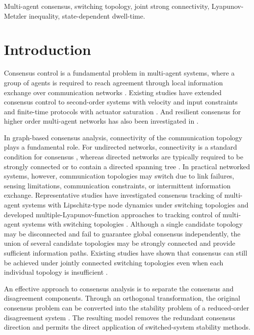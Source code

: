 \documentclass[conference]{IEEEtran}
\begin{document}
	\begin{IEEEkeywords}
		Multi-agent consensus, switching topology, joint strong connectivity, Lyapunov-Metzler inequality, state-dependent dwell-time.
	\end{IEEEkeywords}
	
	\section{Introduction}
	
	Consensus control is a fundamental problem in multi-agent systems,
	where a group of agents is required to reach agreement through local
	information exchange over communication networks
	\cite{olfati2007,wen2021book}. Existing studies have extended consensus control
	to second-order systems with velocity and input constraints and
	finite-time protocols with actuator saturation
	\cite{fu2019constraints,zhao2015finite}. And resilient consensus for higher order multi-agent networks has also been investigated in \cite{zhao2019tracking}.

	
	In graph-based consensus analysis, connectivity of the communication
	topology plays a fundamental role. For undirected networks,
	connectivity is a standard condition for consensus
	\cite{olfati2004}, whereas directed networks are typically required
	to be strongly connected or to contain a directed spanning tree
	\cite{jadbabaie2003,ren2005}. In practical networked systems,
	however, communication topologies may switch due to link failures,
	sensing limitations, communication constraints, or intermittent
	information exchange. Representative studies have investigated consensus tracking of multi-agent systems with Lipschitz-type node dynamics under switching topologies \cite{wen2014tracking} and developed multiple-Lyapunov-function approaches to tracking control of multi-agent systems with switching topologies \cite{wen2019multiple}. Although a single candidate topology
	may be disconnected and fail to guarantee global consensus
	independently, the union of several candidate topologies may be
	strongly connected and provide sufficient information paths.
	Existing studies have shown that consensus can still be achieved
	under jointly connected switching topologies even when each
	individual topology is insufficient
	\cite{cheng2019,li2023}.
	
	An effective approach to consensus analysis is to separate the
	consensus and disagreement components. Through an orthogonal
	transformation, the original consensus problem can be converted into
	the stability problem of a reduced-order disagreement system
	\cite{wang2024protocol}. The resulting model removes the redundant
	consensus direction and permits the direct application of
	switched-system stability methods.
	
\end{document}
